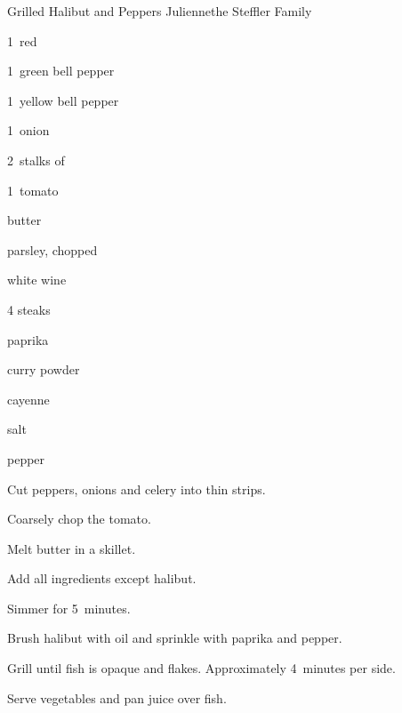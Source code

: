 \begin{recipe}{Grilled Halibut and Peppers Julienne}{the Steffler Family}{}

\begin{ingredients}
\item 1~red 
\item 1~green bell pepper
\item 1~yellow bell pepper
\item 1~onion
\item 2~stalks of 
\item 1~tomato
\item {} butter
\item {} parsley, chopped
\item \C{\twothird} white wine
\item 4  steaks
\item paprika
\item curry powder
\item cayenne
\item salt
\item pepper
\end{ingredients}

\begin{directions}
\item Cut peppers, onions and celery into thin strips.
\item Coarsely chop the tomato.
\item Melt butter in a skillet.
\item Add all ingredients except halibut.
\item Simmer for 5~minutes.
\item Brush halibut with oil and sprinkle with paprika and pepper.
\item Grill until fish is opaque and flakes. Approximately 4~minutes per side.
\item Serve vegetables and pan juice over fish.
\end{directions}
\end{recipe}
